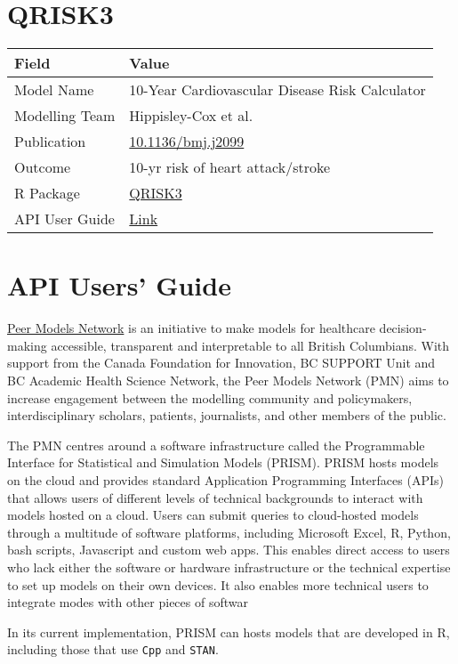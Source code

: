 \documentclass[
]{book}
\begin{document}
\hypertarget{qrisk3}{%
\chapter{QRISK3}\label{qrisk3}}

\begin{longtable}[]{@{}ll@{}}
\toprule
Field & Value\tabularnewline
\midrule
\endhead
Model Name & 10-Year Cardiovascular Disease Risk Calculator\tabularnewline
Modelling Team & Hippisley-Cox et al.\tabularnewline
Publication & \href{https://doi.org/10.1136/bmj.j2099}{10.1136/bmj.j2099}\tabularnewline
Outcome & 10-yr risk of heart attack/stroke\tabularnewline
R Package & \href{https://cran.r-project.org/package=QRISK3}{QRISK3}\tabularnewline
API User Guide & \href{https://resplab.github.io/prismguide/api-users-guide.html\#qrisk3-1}{Link}\tabularnewline
\bottomrule
\end{longtable}

\hypertarget{api-users-guide}{%
\chapter{API Users' Guide}\label{api-users-guide}}

\href{https://www.peermodelsnetwork.com/}{Peer Models Network} is an initiative to make models for healthcare decision-making accessible, transparent and interpretable to all British Columbians. With support from the Canada Foundation for Innovation, BC SUPPORT Unit and BC Academic Health Science Network, the Peer Models Network (PMN) aims to increase engagement between the modelling community and policymakers, interdisciplinary scholars, patients, journalists, and other members of the public.

The PMN centres around a software infrastructure called the Programmable Interface for Statistical and Simulation Models (PRISM). PRISM hosts models on the cloud and provides standard Application Programming Interfaces (APIs) that allows users of different levels of technical backgrounds to interact with models hosted on a cloud. Users can submit queries to cloud-hosted models through a multitude of software platforms, including Microsoft Excel, R, Python, bash scripts, Javascript and custom web apps. This enables direct access to users who lack either the software or hardware infrastructure or the technical expertise to set up models on their own devices. It also enables more technical users to integrate modes with other pieces of softwar

In its current implementation, PRISM can hosts models that are developed in R, including those that use \texttt{Cpp} and \texttt{STAN}.
\end{document}
